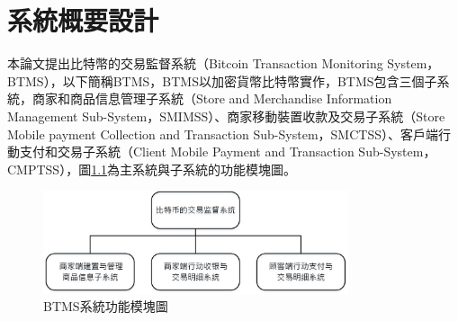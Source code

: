 \chapter{系統概要設計} 


	本論文提出比特幣的交易監督系統（Bitcoin Transaction Monitoring System，BTMS）\supercite{Blockchain-basedpaymentcollectionsupervisionsystemusingpervasiveBitcoindigitalwallet}，以下簡稱BTMS，BTMS以加密貨幣比特幣實作，BTMS包含三個子系統，商家和商品信息管理子系統（Store and Merchandise Information Management Sub-System，SMIMSS）、商家移動裝置收款及交易子系統（Store Mobile payment Collection and Transaction Sub-System，SMCTSS）、客戶端行動支付和交易子系統（Client Mobile Payment and Transaction Sub-System，CMPTSS），圖\ref{model0}為主系統與子系統的功能模塊圖。

	\begin{figure}[!htbp]
		\centering
		\includegraphics[width = 0.8\textwidth]{model0.jpg}
		\caption{BTMS系統功能模塊圖}\label{model0}
	\end{figure}

